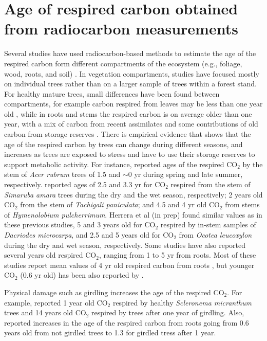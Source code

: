 \documentclass[12pt, a4paper]{article}
\begin{document}
\section{Age of respired carbon obtained from radiocarbon measurements}
Several studies have used radiocarbon-based methods to estimate the age of the respired carbon form different compartments of the ecosystem (e.g., foliage, wood, roots, and soil) \citep{carbone:2007, Carbone:200713, carbone:2013, muhr:2013, Muhr:2018, Trumbore:2015}. 
In vegetation compartments, studies have focused mostly on individual trees rather than on a larger sample of trees within a forest stand. For healthy mature trees, small differences have been found between compartments, for example carbon respired from leaves may be less than one year old \citep{carbone:2007}, while in roots and stems the respired carbon is on average older than one year, with a mix of carbon from recent assimilates and some contributions of old carbon from storage reserves \citep{Muhr:2018}. There is empirical evidence that shows that the age of the respired carbon by trees can change during different seasons, and increases as trees are exposed to stress and have to use their storage reserves to support metabolic activity.  For instance, \citet{carbone:2013} reported ages of the respired CO$_2$ by the stem of \textit{Acer rubrum} trees of 1.5 and  $\sim$0 yr during spring and late summer, respectively. \citet{muhr:2013} reported ages of 2.5 and 3.3 yr for CO$_2$ respired from the stem of \textit{Simaruba amara} trees during the dry and the wet season, respectively; 2 years old CO$_2$ from the stem of \textit{Tachigali paniculata}; and 4.5 and 4 yr old CO$_2$ from stems of \textit{Hymenolobium pulcherrimum}. Herrera et al (in prep) found similar values as in these previous studies, 5 and 3 years old for CO$_2$ respired by in-stem samples of \textit{Dacriodes microcarpa}, and 2.5 and 5 years old for CO$_2$ from \textit{Ocotea leucoxylon} during the dry  and wet season, respectively. Some studies have also reported several years old respired CO$_2$, ranging from 1 to 5 yr from roots. Most of these studies report mean values of 4 yr old respired carbon from roots \citep{CZIMCZIK:2006td, Schuur:2006tm, carbone:2007}, but younger CO$_2$ (0.6 yr old) has been also reported by \citet{Hilman:2021us}. 

Physical damage such as girdling increases the age of the respired CO$_2$. For example, \citet{Muhr:2018} reported 1 year old CO$_2$ respired by healthy \textit{Scleronema micranthum} trees and 14 years old CO$_2$ respired by trees after one year of girdling. Also, \citet{Hilman:2021us} reported increases in the age of the respired carbon from roots going from 0.6 years old from not girdled trees to 1.3 for girdled tress after 1 year.  
\end{document}
